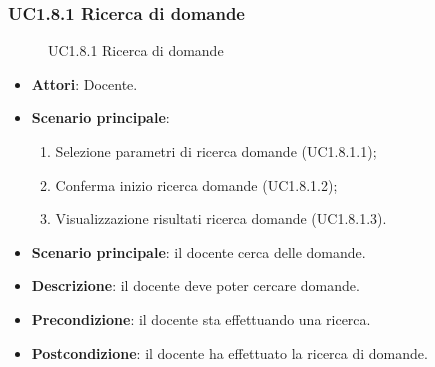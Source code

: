 \subsubsection{UC1.8.1 Ricerca di domande}
\begin{figure}[H]
\centering
\noindent{}
\caption{UC1.8.1 Ricerca di domande}
\end{figure}
\begin{itemize}
\item \textbf{Attori}: Docente.
\item \textbf{Scenario principale}:
\begin{enumerate}
\item Selezione parametri di ricerca domande (UC1.8.1.1);
\item Conferma inizio ricerca domande (UC1.8.1.2);
\item Visualizzazione risultati ricerca domande (UC1.8.1.3).
\end{enumerate}
\item \textbf{Scenario principale}: il docente cerca delle domande.
\item \textbf{Descrizione}: il docente deve poter cercare domande.
\item \textbf{Precondizione}: il docente sta effettuando una ricerca.
\item \textbf{Postcondizione}: il docente ha effettuato la ricerca di domande.
\end{itemize}
